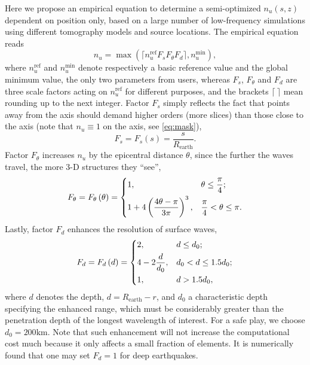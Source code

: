 \documentclass[extra,referee]{gji}
\begin{document}
Here we propose an empirical equation to determine 
a semi-optimized $n_u\left(s,z\right)$ dependent on position only, based on
a large number of low-frequency simulations using different tomography 
models and source locations. The empirical equation reads
\begin{equation}
  n_u=\max\left(\lceil n_u^\text{ref} F_s F_\theta F_d\rceil, n_u^\text{min}\right),
  \label{eq:nu}
\end{equation}
where $n_u^\text{ref}$ and $n_u^\text{min}$ denote respectively 
a basic reference value and the global minimum value, the only
two parameters from users, whereas $F_s$, $F_\theta$ and $F_d$
are three scale factors acting on $n_u^\text{ref}$ 
for different purposes, and the brackets $\lceil\ \rceil$ mean rounding 
up to the next integer.
Factor $F_s$ simply reflects the fact that points away from the axis 
should demand higher orders (more slices) than those close to the axis 
(note that $n_u\equiv 1$ on the axis, see \eqref{eq:mask}),  
\begin{equation}
  F_s=F_s\left(s\right)=\frac{s}{R_\text{earth}}.
  \label{eq:fs}
\end{equation}
Factor $F_\theta$ increases $n_u$ by the epicentral distance $\theta$,
since the further the waves travel, the more 3-D structures they ``see'',
\begin{equation}
  F_\theta=F_\theta\left(\theta\right)=
  \begin{dcases}
    1,&\theta\le\frac{\pi}{4};\\
    1+4\left(\frac{4\theta-\pi}{3\pi}\right)^3,&
    \frac{\pi}{4}<\theta\le\pi.
  \end{dcases}
  \label{eq:ft}
\end{equation}
Lastly, factor $F_d$ enhances the resolution of surface waves, 
\begin{equation}
  F_d=F_d\left(d\right)=
  \begin{dcases}
    2, & d \le d_{0}; \\
    4-2\frac{d}{d_{0}}, 
    &d_{0}<d\le1.5d_{0};\\
    1,& d > 1.5 d_{0},
  \end{dcases}
  \label{eq:fd}
\end{equation}
where $d$ denotes the depth, $d=R_\text{earth}-r$,
and $d_{0}$ a characteristic depth specifying 
the enhanced range, which must be considerably
greater than the penetration depth of the longest wavelength 
of interest. For a safe play, we choose $d_{0}=200\text{km}$.
Note that such enhancement will not increase the computational
cost much because it only affects a small fraction of elements. 
It is numerically found that one may set $F_d=1$ for deep 
earthquakes.
\end{document}
